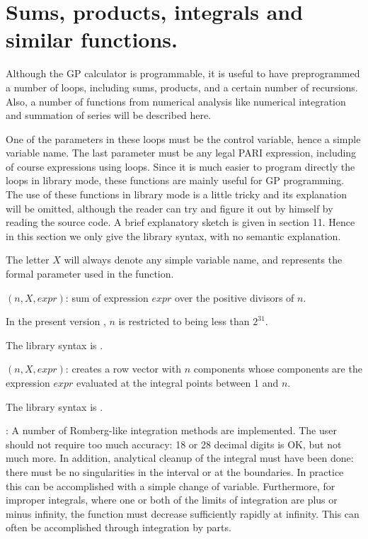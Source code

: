 \section{Sums, products, integrals and similar functions.}

Although the GP calculator is programmable,
it is useful to have preprogrammed a number of loops, including sums, products,
and a certain number of recursions. Also, a number of functions from numerical
analysis like numerical integration and summation of series will be
described here.

One of the parameters in these loops must be the control variable, hence a
simple variable name. The last parameter must be any legal PARI expression,
including of course expressions using loops. 
Since it is much easier to program directly the loops in library mode, these
functions are mainly useful for GP programming. The use of these functions
in library mode is a little tricky and its explanation will be 
omitted, although the reader can try and figure it out by himself by reading
the source code. A brief explanatory sketch is given in section 11.
Hence in this section we only give the library syntax, with no semantic
explanation.

The letter $X$ will always denote any simple variable name, and represents the
formal parameter used in the function.

$(n,X,expr)$: sum of expression $expr$ over
the positive divisors of $n$.

In the present version \vers, $n$ is restricted to being less than $2^{31}$.

The library syntax is .

$(n,X,expr)$: creates a row vector with $n$ components
whose components are the expression $expr$ evaluated at the integral points
between 1 and $n$.

The library syntax is .

:
A number of Romberg-like integration methods are implemented. The user should
not require too much accuracy: 18 or 28 decimal digits is OK, but not much 
more. In addition, analytical cleanup of the integral must have been done: 
there must be no singularities in the interval or at the boundaries. In 
practice this can be accomplished with a simple change of variable. 
Furthermore, for improper integrals, where one or both of the limits of 
integration are plus or minus infinity, the function must decrease 
sufficiently rapidly at infinity. This can often be accomplished
through integration by parts.


